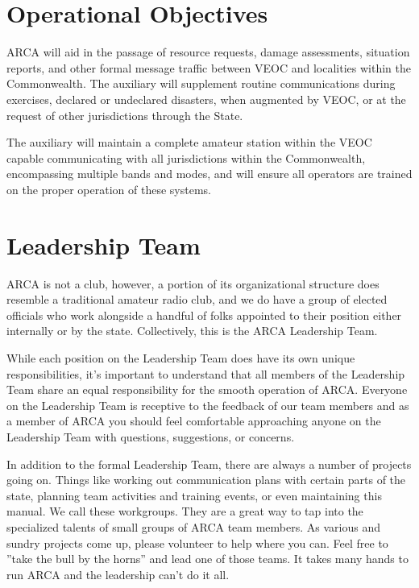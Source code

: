 \documentclass[pdflatex,letterpaper,twoside,12pt]{book}
\begin{document}

\section{Operational Objectives}

ARCA will aid in the passage of resource requests, damage assessments, situation reports, and other formal message traffic between VEOC and localities within the Commonwealth.   The auxiliary will supplement routine communications during exercises, declared or undeclared disasters, when augmented by VEOC, or at the request of other jurisdictions through the State.

The auxiliary will maintain a complete amateur station within the VEOC capable communicating with all jurisdictions within the Commonwealth, encompassing multiple bands and modes, and will ensure all operators are trained on the proper operation of these systems.


\section{Leadership Team}

ARCA is not a club, however, a portion of its organizational structure does resemble a traditional amateur radio club, and we do have a group of elected officials who work alongside a handful of folks appointed to their position either internally or by the state.  Collectively, this is the ARCA Leadership Team.

While each position on the Leadership Team does have its own unique responsibilities, it's important to understand that all members of the Leadership Team share an equal responsibility for the smooth operation of ARCA.  Everyone on the Leadership Team is receptive to the feedback of our team members and as a member of ARCA you should feel comfortable approaching anyone on the Leadership Team with questions, suggestions, or concerns.

In addition to the formal Leadership Team, there are always a number of projects going on.  Things like working out communication plans with certain parts of the state, planning team activities and training events, or even maintaining this manual.  We call these workgroups.  They are a great way to tap into the specialized talents of small groups of ARCA team members.  As various and sundry projects come up, please volunteer to help where you can.  Feel free to ''take the bull by the horns'' and lead one of those teams.  It takes many hands to run ARCA and the leadership can't do it all.
\end{document}
